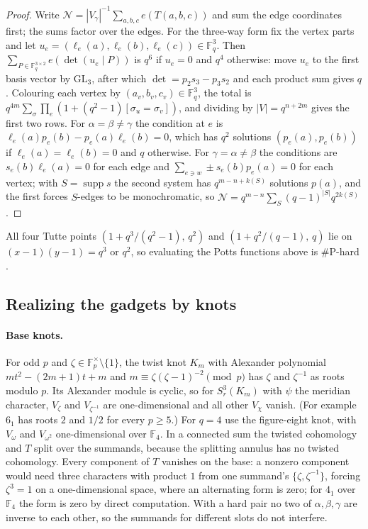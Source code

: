 \documentclass[11pt]{article}
\theoremstyle{definition}
\theoremstyle{remark}
\newcommand{\F}{\mathbb{F}}
\newcommand{\cN}{\mathcal{N}}
\newcommand{\sharpP}{\#\mathrm{P}}
\begin{document}
\begin{proof}
Write $\cN=|V_\gamma|^{-1}\sum_{a,b,c}e(T(a,b,c))$ and sum the edge coordinates
first; the sums factor over the edges. For the three-way form fix the vertex
parts and let $u_e=(\ell_e(a),\ell_e(b),\ell_e(c))\in\F_q^3$. Then
$\sum_{P\in\F_q^{3\times2}}e(\det(u_e\mid P))$ is $q^6$ if $u_e=0$ and $q^4$
otherwise: move $u_e$ to the first basis vector by $\mathrm{GL}_3$, after which
$\det=p_2s_3-p_3s_2$ and each product sum gives $q$. Colouring each vertex by
$(a_v,b_v,c_v)\in\F_q^3$, the total is
$q^{4m}\sum_\sigma\prod_e(1+(q^2-1)[\sigma_u=\sigma_v])$, and dividing by
$|V|=q^{n+2m}$ gives the first two rows. For $\alpha=\beta\ne\gamma$ the
condition at $e$ is $\ell_e(a)p_e(b)-p_e(a)\ell_e(b)=0$, which has $q^2$
solutions $(p_e(a),p_e(b))$ if $\ell_e(a)=\ell_e(b)=0$ and $q$ otherwise. For
$\gamma=\alpha\ne\beta$ the conditions are $s_e(b)\ell_e(a)=0$ for each edge
and $\sum_{e\ni w}\pm s_e(b)p_e(a)=0$ for each vertex; with $S=\operatorname{supp}s$
the second system has $q^{m-n+k(S)}$ solutions $p(a)$, and the first forces
$S$-edges to be monochromatic, so $\cN=q^{m-n}\sum_{S}(q-1)^{|S|}q^{2k(S)}$.
\end{proof}

All four Tutte points $(1+q^3/(q^2-1),\,q^2)$ and $(1+q^2/(q-1),\,q)$ lie on
$(x-1)(y-1)=q^3$ or $q^2$, so evaluating the Potts functions above is
$\sharpP$-hard \cite{JVW90}.

\subsection{Realizing the gadgets by knots}

\paragraph{Base knots.} For odd $p$ and $\zeta\in\F_p^\times\setminus\{1\}$,
the twist knot $K_m$ with Alexander polynomial $mt^2-(2m+1)t+m$ and
$m\equiv\zeta(\zeta-1)^{-2}\pmod p$ has $\zeta$ and $\zeta^{-1}$ as roots
modulo $p$. Its Alexander module is cyclic, so for $S^3_r(K_m)$ with $\psi$
the meridian character, $V_\zeta$ and $V_{\zeta^{-1}}$ are one-dimensional and
all other $V_\chi$ vanish. (For example $6_1$ has roots $2$ and $1/2$ for
every $p\ge5$.) For $q=4$ use the figure-eight knot, with $V_{\omega}$ and
$V_{\omega^2}$ one-dimensional over $\F_4$. In a connected sum the twisted
cohomology and $T$ split over the summands, because the splitting annulus has
no twisted cohomology. Every component of $T$ vanishes on the base: a nonzero
component would need three characters with product $1$ from one summand's
$\{\zeta,\zeta^{-1}\}$, forcing $\zeta^3=1$ on a one-dimensional space, where an
alternating form is zero; for $4_1$ over $\F_4$ the form is zero by direct
computation. With a hard pair no two of $\alpha,\beta,\gamma$ are inverse to
each other, so the summands for different slots do not interfere.
\end{document}
